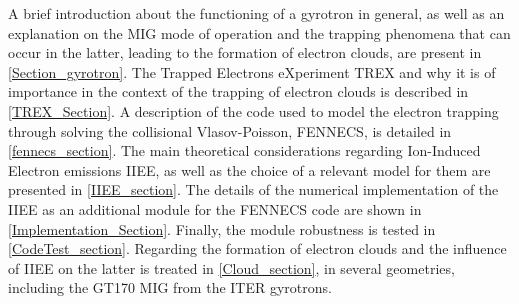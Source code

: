 A brief introduction about the functioning of  a gyrotron in general, as well as an explanation on the MIG mode of operation and the trapping phenomena that can occur in the latter, leading to the formation of electron clouds, are present in \ref{Section_gyrotron}. The Trapped Electrons eXperiment TREX and why it is of importance in the context of the trapping of electron clouds is described in \ref{TREX_Section}. A description of the code used to model the electron trapping through solving the collisional Vlasov-Poisson, FENNECS, is detailed in \ref{fennecs_section}. The main theoretical considerations regarding Ion-Induced Electron emissions IIEE, as well as the choice of a relevant model for them are presented in \ref{IIEE_section}. The details of the numerical implementation of the IIEE as an additional module for the FENNECS code are shown in \ref{Implementation_Section}.  Finally, the module robustness is tested in \ref{CodeTest_section}.  Regarding the formation of electron clouds and the influence of IIEE on the latter is treated in \ref{Cloud_section}, in several geometries, including the GT170 MIG from the ITER gyrotrons. 